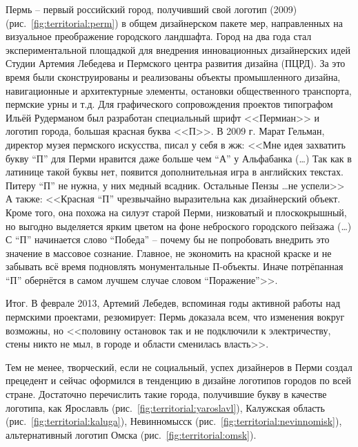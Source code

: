 Пермь -- первый российский город, получивший свой логотип (2009) (рис.~\ref{fig:territorial:perm}) в
общем дизайнерском пакете мер, направленных на  визуальное преображение городского ландшафта.  Город
на два года стал экспериментальной площадкой для внедрения инновационных дизайнерских идей Студии
Артемия Лебедева и Пермского центра развития дизайна (ПЦРД). За это время были сконструированы и
реализованы объекты промышленного дизайна, навигационные и  архитектурные элементы, остановки
общественного транспорта, пермские урны и т.д. Для графического сопровождения проектов типографом
Ильёй Рудерманом был разработан  специальный шрифт <<Пермиан>> и логотип города, большая красная
буква <<П>>.  В 2009 г. Марат Гельман, директор музея пермского искусства, писал у себя в жж: <<Мне
идея захватить букву ``П'' для Перми нравится даже больше чем ``А'' у Альфабанка (\ldots) Так как в
латинице такой буквы нет, появится дополнительная игра в английских текстах. Питеру ``П'' не нужна,
у них медный всадник. Остальные Пензы \ldots не успели>> \autocite{link:gelman} А также: <<Красная
``П'' чрезвычайно выразительна как дизайнерский объект. Кроме того, она похожа на силуэт старой Перми,
низковатый и плоскокрышный, но выгодно выделяется ярким цветом на фоне неброского городского пейзажа
(\ldots) С ``П'' начинается слово ``Победа'' -- почему бы не попробовать внедрить это значение в массовое
сознание. Главное, не экономить на красной краске и не забывать всё время подновлять монументальные
П-объекты. Иначе потрёпанная ``П'' обернётся в самом лучшем случае словом
``Поражение''>>. \autocite[][361]{book:gordon}

Итог. В феврале 2013, Артемий Лебедев, вспоминая годы активной работы над пермскими проектами,
резюмирует: Пермь доказала всем, что изменения вокруг возможны, но <<половину остановок так и не
подключили к электричеству, стены никто не мыл, в городе и области сменилась власть>>. \autocite{link:lebedev}

Тем не менее, творческий, если не социальный, успех дизайнеров в Перми создал прецедент и сейчас
оформился в тенденцию в дизайне логотипов городов по всей стране.  Достаточно перечислить такие
города, получившие букву в качестве логотипа, как Ярославль (рис.~\ref{fig:territorial:yaroslavl}),
Калужская область (рис.~\ref{fig:territorial:kaluga}), Невинномысск
(рис.~\ref{fig:territorial:nevinnomisk}), альтернативный логотип Омска (рис.~\ref{fig:territorial:omsk}).

